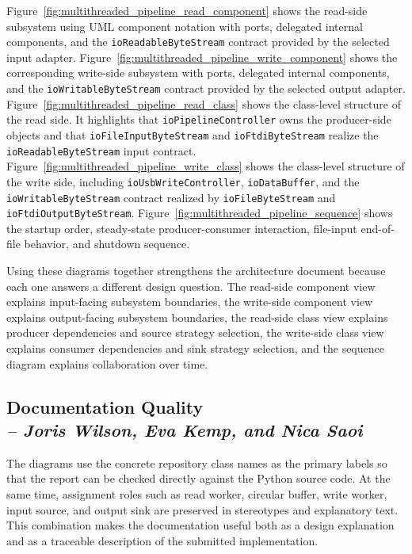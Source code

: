 Figure~\ref{fig:multithreaded_pipeline_read_component} shows the read-side subsystem using UML component notation with ports, delegated internal components, and the \texttt{ioReadableByteStream} contract provided by the selected input adapter. Figure~\ref{fig:multithreaded_pipeline_write_component} shows the corresponding write-side subsystem with ports, delegated internal components, and the \texttt{ioWritableByteStream} contract provided by the selected output adapter. Figure~\ref{fig:multithreaded_pipeline_read_class} shows the class-level structure of the read side. It highlights that \texttt{ioPipelineController} owns the producer-side objects and that \texttt{ioFileInputByteStream} and \texttt{ioFtdiByteStream} realize the \texttt{ioReadableByteStream} input contract. Figure~\ref{fig:multithreaded_pipeline_write_class} shows the class-level structure of the write side, including \texttt{ioUsbWriteController}, \texttt{ioDataBuffer}, and the \texttt{ioWritableByteStream} contract realized by \texttt{ioFileByteStream} and \texttt{ioFtdiOutputByteStream}. Figure~\ref{fig:multithreaded_pipeline_sequence} shows the startup order, steady-state producer-consumer interaction, file-input end-of-file behavior, and shutdown sequence.

Using these diagrams together strengthens the architecture document because each one answers a different design question. The read-side component view explains input-facing subsystem boundaries, the write-side component view explains output-facing subsystem boundaries, the read-side class view explains producer dependencies and source strategy selection, the write-side class view explains consumer dependencies and sink strategy selection, and the sequence diagram explains collaboration over time.


\subsection{Documentation Quality \\
\small{\textit{-- Joris Wilson, Eva Kemp, and Nica Saoi}}}
\label{Section::Documentation Quality}

The diagrams use the concrete repository class names as the primary labels so that the report can be checked directly against the Python source code. At the same time, assignment roles such as read worker, circular buffer, write worker, input source, and output sink are preserved in stereotypes and explanatory text. This combination makes the documentation useful both as a design explanation and as a traceable description of the submitted implementation.


